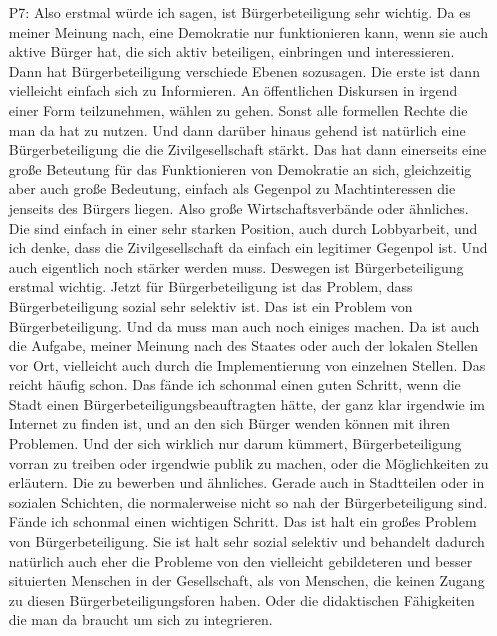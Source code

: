 \begin{itemize}
    \item[P7:] Also erstmal w{\"u}rde ich sagen, ist B{\"u}rgerbeteiligung sehr wichtig. Da es meiner Meinung nach, eine Demokratie nur funktionieren kann, wenn sie auch aktive B{\"u}rger hat, die sich aktiv beteiligen, einbringen und interessieren. Dann hat B{\"u}rgerbeteiligung verschiede Ebenen sozusagen. Die erste ist dann vielleicht einfach sich zu Informieren. An {\"o}ffentlichen Diskursen in irgend einer Form teilzunehmen, w{\"a}hlen zu gehen. Sonst alle formellen Rechte die man da hat zu nutzen. Und dann dar{\"u}ber hinaus gehend ist nat{\"u}rlich eine B{\"u}rgerbeteiligung die die Zivilgesellschaft st{\"a}rkt. Das hat dann einerseits eine gro{\ss}e Beteutung f{\"u}r das Funktionieren von Demokratie an sich, gleichzeitig aber auch gro{\ss}e Bedeutung, einfach als Gegenpol zu Machtinteressen die jenseits des B{\"u}rgers liegen. Also gro{\ss}e Wirtschaftsverb{\"a}nde oder {\"a}hnliches. Die sind einfach in einer sehr starken Position, auch durch Lobbyarbeit, und ich denke, dass die Zivilgesellschaft da einfach ein legitimer Gegenpol ist. Und auch eigentlich noch st{\"a}rker werden muss. Deswegen ist B{\"u}rgerbeteiligung erstmal wichtig. Jetzt f{\"u}r B{\"u}rgerbeteiligung ist das Problem, dass B{\"u}rgerbeteiligung sozial sehr selektiv ist. Das ist ein Problem von B{\"u}rgerbeteiligung. Und da muss man auch noch einiges machen. Da ist auch die Aufgabe, meiner Meinung nach des Staates oder auch der lokalen Stellen vor Ort, vielleicht auch durch die Implementierung von einzelnen Stellen. Das reicht h{\"a}ufig schon. Das f{\"a}nde ich schonmal einen guten Schritt, wenn die Stadt einen B{\"u}rgerbeteiligungsbeauftragten h{\"a}tte, der ganz klar irgendwie im Internet zu finden ist, und an den sich B{\"u}rger wenden k{\"o}nnen mit ihren Problemen. Und der sich wirklich nur darum k{\"u}mmert, B{\"u}rgerbeteiligung vorran zu treiben oder irgendwie publik zu machen, oder die M{\"o}glichkeiten zu erl{\"a}utern. Die zu bewerben und {\"a}hnliches. Gerade auch in Stadtteilen oder in sozialen Schichten, die normalerweise nicht so nah der B{\"u}rgerbeteiligung sind. F{\"a}nde ich schonmal einen wichtigen Schritt. Das ist halt ein gro{\ss}es Problem von B{\"u}rgerbeteiligung. Sie ist halt sehr sozial selektiv und behandelt dadurch nat{\"u}rlich auch eher die Probleme von den vielleicht gebildeteren und besser situierten Menschen in der Gesellschaft, als von Menschen, die keinen Zugang zu diesen B{\"u}rgerbeteiligungsforen haben. Oder die didaktischen F{\"a}higkeiten die man da braucht um sich zu integrieren. 
\end{itemize}

